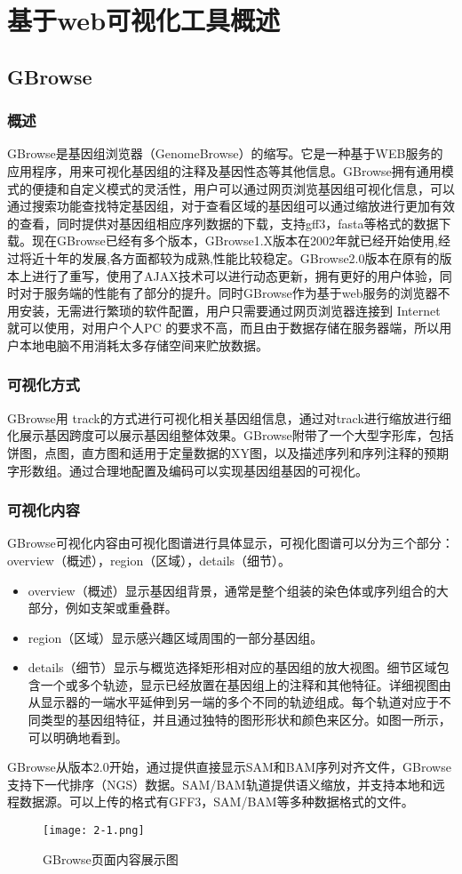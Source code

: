 \chapter{基于web可视化工具概述}
	\section{GBrowse}
		\subsection{概述}
		GBrowse是基因组浏览器（GenomeBrowse）的缩写。它是一种基于WEB服务的应用程序，用来可视化基因组的注释及基因性态等其他信息。GBrowse拥有通用模式的便捷和自定义模式的灵活性，用户可以通过网页浏览基因组可视化信息，可以通过搜索功能查找特定基因组，对于查看区域的基因组可以通过缩放进行更加有效的查看，同时提供对基因组相应序列数据的下载，支持gff3，fasta等格式的数据下载。现在GBrowse已经有多个版本，GBrowse1.X版本在2002年就已经开始使用,经过将近十年的发展,各方面都较为成熟,性能比较稳定。GBrowse2.0版本在原有的版本上进行了重写，使用了AJAX技术可以进行动态更新，拥有更好的用户体验，同时对于服务端的性能有了部分的提升。同时GBrowse作为基于web服务的浏览器不用安装，无需进行繁琐的软件配置，用户只需要通过网页浏览器连接到 Internet 就可以使用，对用户个人PC 的要求不高，而且由于数据存储在服务器端，所以用户本地电脑不用消耗太多存储空间来贮放数据。
		\subsection{可视化方式}
		GBrowse用 track的方式进行可视化相关基因组信息，通过对track进行缩放进行细化展示基因跨度可以展示基因组整体效果。GBrowse附带了一个大型字形库，包括饼图，点图，直方图和适用于定量数据的XY图，以及描述序列和序列注释的预期字形数组。通过合理地配置及编码可以实现基因组基因的可视化。
		\subsection{可视化内容}
		GBrowse可视化内容由可视化图谱进行具体显示，可视化图谱可以分为三个部分：overview（概述），region（区域），details（细节）。
		\begin{itemize}
			\item  overview（概述）显示基因组背景，通常是整个组装的染色体或序列组合的大部分，例如支架或重叠群。
			\item region（区域）显示感兴趣区域周围的一部分基因组。
			\item details（细节）显示与概览选择矩形相对应的基因组的放大视图。细节区域包含一个或多个轨迹，显示已经放置在基因组上的注释和其他特征。详细视图由从显示器的一端水平延伸到另一端的多个不同的轨迹组成。每个轨道对应于不同类型的基因组特征，并且通过独特的图形形状和颜色来区分。如图一所示，可以明确地看到。
		\end{itemize}
	GBrowse从版本2.0开始，通过提供直接显示SAM和BAM序列对齐文件，GBrowse支持下一代排序（NGS）数据。SAM/BAM轨道提供语义缩放，并支持本地和远程数据源。可以上传的格式有GFF3，SAM/BAM等多种数据格式的文件。
		\begin{figure}
			\centering
			\texttt{[image: 2-1.png]}
			\caption{GBrowse页面内容展示图}
		\end{figure}	
